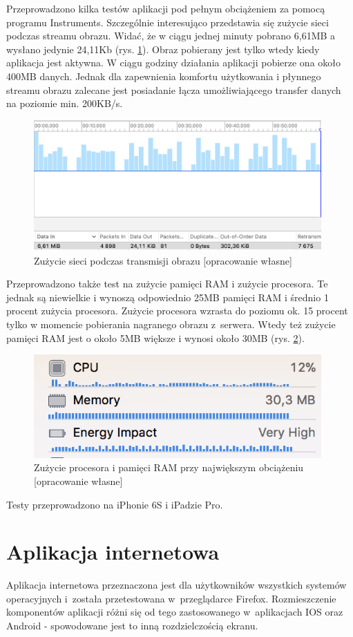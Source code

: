 Przeprowadzono kilka testów aplikacji pod pełnym obciążeniem za pomocą programu Instruments. Szczególnie interesująco przedstawia się zużycie sieci podczas streamu obrazu. Widać, że w ciągu jednej minuty pobrano 6,61MB a wysłano jedynie 24,11Kb (rys. \ref{netuse}). Obraz pobierany jest tylko wtedy kiedy aplikacja jest aktywna. W ciągu godziny działania aplikacji pobierze ona około 400MB danych. Jednak dla zapewnienia komfortu użytkowania i płynnego streamu obrazu zalecane jest posiadanie łącza umożliwiającego transfer danych na poziomie min. 200KB/s. 
\begin{figure}[H]
	\centering
	\includegraphics[width=11cm]{ios_screenshots/networkUsage.png}
	\caption{Zużycie sieci podczas transmisji obrazu [opracowanie własne]}
	\label{netuse}
\end{figure}
Przeprowadzono także test na zużycie pamięci RAM i zużycie procesora. Te jednak są niewielkie i wynoszą odpowiednio 25MB pamięci RAM i średnio 1 procent zużycia procesora.
Zużycie procesora wzrasta do poziomu ok. 15 procent tylko w momencie pobierania nagranego obrazu z~serwera. Wtedy też zużycie pamięci RAM jest o około 5MB większe i wynosi około 30MB (rys. \ref{cpuram}).
\begin{figure}[H]
	\centering 
	\includegraphics[width=11cm]{ios_screenshots/CPURAM.png}
	\caption{Zużycie procesora i pamięci RAM przy największym obciążeniu [opracowanie własne]}
	\label{cpuram}
\end{figure}
Testy przeprowadzono na iPhonie 6S i iPadzie Pro.


\section{Aplikacja internetowa}
Aplikacja internetowa przeznaczona jest dla użytkowników wszystkich systemów operacyjnych i~została przetestowana w~przeglądarce Firefox. Rozmieszczenie komponentów aplikacji różni się od tego zastosowanego w~aplikacjach IOS oraz Android - spowodowane jest to inną rozdzielczością ekranu. 

